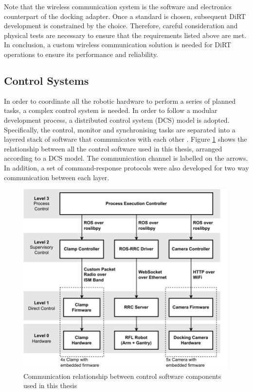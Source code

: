 Note that the wireless communication system is the software and electronics counterpart of the docking adapter. Once a standard is chosen, subsequent DiRT development is constrained by the choice. Therefore, careful consideration and physical tests are necessary to ensure that the requirements listed above are met. In conclusion, a custom wireless communication solution is needed for DiRT operations to ensure its performance and reliability.

\subsection{Control Systems}
\label{subsection:discussion-control-systems}

In order to coordinate all the robotic hardware to perform a series of planned tasks, a complex control system is needed. In order to follow a modular development process, a distributed control system (DCS) model is adopted. Specifically, the control, monitor and synchronising tasks are separated into a layered stack of software that communicates with each other . Figure \ref{fig:communication-software-relationship} shows the relationship between all the control software used in this thesis, arranged according to a DCS model. The communication channel is labelled on the arrows. In addition, a set of command-response protocols were also developed for two way communication between each layer. 

\begin{figure}[ht!]
    \centering
    \includegraphics[width=0.99\textwidth]{images/10/Control Software Relationships.pdf}
    \caption{Communication relationship between control software components used in this thesis}
    \label{fig:communication-software-relationship}
\end{figure}

